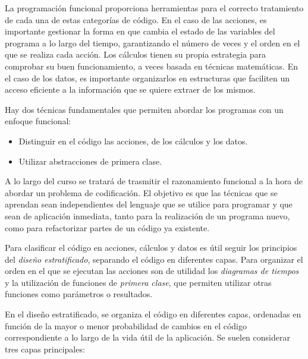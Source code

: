 La programación funcional proporciona herramientas para el correcto tratamiento de cada una de estas categorías de código. En el caso de las acciones, es importante gestionar la forma en que cambia el estado de las variables del programa a lo largo del tiempo, garantizando el número de veces y el orden en el que se realiza cada acción. Los cálculos tienen su propia estrategia para comprobar su buen funcionamiento, a veces basada en técnicas matemáticas. En el caso de los datos, es importante organizarlos en estructuras que faciliten un acceso eficiente a la información que se quiere extraer de los mismos.

Hay dos técnicas fundamentales que permiten abordar los programas con un enfoque funcional: 
\begin{itemize}
   \item Distinguir en el código las acciones, de los cálculos y los datos.
   \item Utilizar abstracciones de primera clase.
\end{itemize}

A lo largo del curso se tratará de trasmitir el razonamiento funcional a la hora de abordar un problema de codificación. El objetivo es que las técnicas que se aprendan sean independientes del lenguaje que se utilice para programar y que sean de aplicación inmediata, tanto para la realización de un programa nuevo, como para refactorizar partes de un código ya existente.

Para clasificar el código en acciones, cálculos y datos es útil seguir los principios del \textit{diseño estratificado}, separando el código en diferentes capas. Para organizar el orden en el que se ejecutan las acciones son de utilidad los \textit{diagramas de tiempos} y la utilización de funciones de \textit{primera clase}, que permiten utilizar otras funciones como parámetros o resultados.

En el diseño estratificado, se organiza el código en diferentes capas, ordenadas en función de la mayor o menor probabilidad de cambios en el código correspondiente a lo largo de la vida útil de la aplicación. Se suelen considerar tres capas principales:

